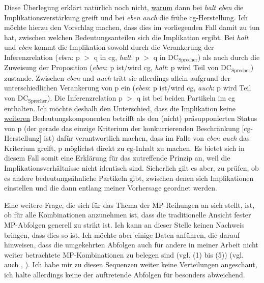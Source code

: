 Diese Überlegung erklärt natürlich noch nicht, \underline{warum} dann bei \textit{halt eben} die Implikationsverstärkung greift und bei \textit{eben auch} die frühe cg-Herstellung. Ich möchte hierzu den Vorschlag machen, dass dies im vorliegenden Fall damit zu tun hat, zwischen welchen Bedeutungsanteilen sich die Implikation ergibt. Bei \textit{halt} und \textit{eben} kommt die Implikation sowohl durch die Verankerung der Infe\-renzrelation (\textit{eben}: p $>$ q in cg, \textit{halt}: p $>$ q in DC$_{\textrm{Sprecher}}$) als auch durch die Zuweisung der Proposition (\textit{eben}: p ist/wird cg, \textit{halt}: p wird Teil von DC$_{\textrm{Sprecher}}$) zustande. Zwischen \textit{eben} und \textit{auch} tritt sie allerdings allein aufgrund der unterschiedlichen Verankerung von p ein (\textit{eben}: p ist/wird cg, \textit{auch}: p wird Teil von DC$_{\textrm{Sprecher}}$). Die Inferenzrelation p $>$ q ist bei beiden Partikeln im cg enthalten. Ich möchte deshalb den Unterschied, dass die Implikation keine \underline{weiteren} Bedeutungskomponenten betrifft als den (nicht) präsupponierten Status von p (der gerade das einzige Kriterium der konkurrierenden Beschränkung $[$cg-Herstellung$]$ ist) dafür verantwortlich machen, dass im Falle von \textit{eben auch} das Kriterium greift, p möglichst direkt zu cg-Inhalt zu machen. Es bietet sich in diesem Fall somit eine Erklärung für das zutreffende Prinzip an, weil die Implikationsverhältnisse nicht identisch sind. Sicherlich gilt es aber, zu prüfen, ob es andere bedeutungsähnliche Partikeln gibt, zwischen denen sich Implikationen einstellen und die dann entlang meiner Vorhersage geordnet werden.

Eine weitere Frage, die sich für das Thema der MP-Reihungen an sich stellt, ist, ob für alle Kombinationen anzunehmen ist, dass die traditionelle Ansicht fester MP-Abfolgen generell zu strikt ist. Ich kann an dieser Stelle keinen Nachweis bringen, dass dies so ist. Ich möchte aber einige Daten anführen, die darauf hinweisen, dass die umgekehrten Abfolgen auch für andere in meiner Arbeit nicht weiter betrachtete MP-Kombinationen zu belegen sind (vgl. (1) bis (5)) (vgl. auch \citealt[251-252]{Mueller2017a}, \citeyear[237]{Mueller2017b}). Ich habe mir zu diesen Sequenzen weiter keine Verteilungen angeschaut, ich halte allerdings keine der auftretende Abfolgen für besonders abweichend.

